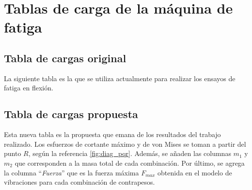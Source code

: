 %
\chapter{Tablas de carga de la máquina de fatiga}
\label{ch:anexo_b}

\section{Tabla de cargas original}
\label{sec:anexob1}

La siguiente tabla es la que se utiliza actualmente para realizar los ensayos de fatiga en flexión. 



\section{Tabla de cargas propuesta}
\label{sec:anexob2}

Esta nueva tabla es la propuesta que emana de los resultados del trabajo realizado. Los esfuerzos de cortante máximo y de von Mises se toman a partir del punto $R$, según la referencia \ref{fig:diag_pqr}. Además, se añaden las columnas $m_1$ y $m_2$ que corresponden a la masa total de cada combinación. Por último, se agrega la columna  ``\textit{Fuerza}'' que es la fuerza máxima $F_{max}$ obtenida en el modelo de vibraciones para cada combinación de contrapesos.

